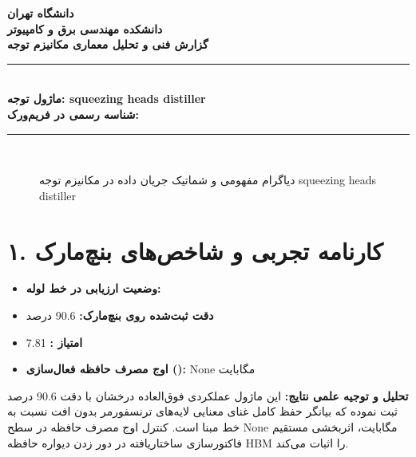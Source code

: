 \documentclass[12pt,a4paper]{article}
\begin{document}
\begin{center}
{\Large\bfseries دانشگاه تهران}\\[0.2cm]
{\large\bfseries دانشکده مهندسی برق و کامپیوتر}\\[0.2cm]
{\large\bfseries گزارش فنی و تحلیل معماری مکانیزم توجه}\\[0.5cm]
\rule{\linewidth}{1pt}\\[0.3cm]
{\LARGE\bfseries ماژول توجه: squeezing heads distiller}\\[0.2cm]
{\large \textbf{شناسه رسمی در فریم‌ورک:} }\\[0.2cm]
\rule{\linewidth}{1pt}\\[0.5cm]
\end{center}

\begin{figure}[H]
\centering
{}
\caption{دیاگرام مفهومی و شماتیک جریان داده در مکانیزم توجه squeezing heads distiller}
\end{figure}

\section*{۱. کارنامه تجربی و شاخص‌های بنچ‌مارک}
\begin{itemize}
\item \textbf{وضعیت ارزیابی در خط لوله:} 
\item \textbf{دقت ثبت‌شده روی بنچ‌مارک:} 90.6 درصد
\item \textbf{امتیاز :} 7.81
\item \textbf{اوج مصرف حافظه فعال‌سازی ():} None مگابایت
\end{itemize}
\textbf{تحلیل و توجیه علمی نتایج:} این ماژول عملکردی فوق‌العاده درخشان با دقت 90.6 درصد ثبت نموده که بیانگر حفظ کامل غنای معنایی لایه‌های ترنسفورمر بدون افت نسبت به خط مبنا است. کنترل اوج مصرف حافظه در سطح None مگابایت، اثربخشی مستقیم فاکتورسازی ساختاریافته در دور زدن دیواره حافظه HBM را اثبات می‌کند.
\end{document}
